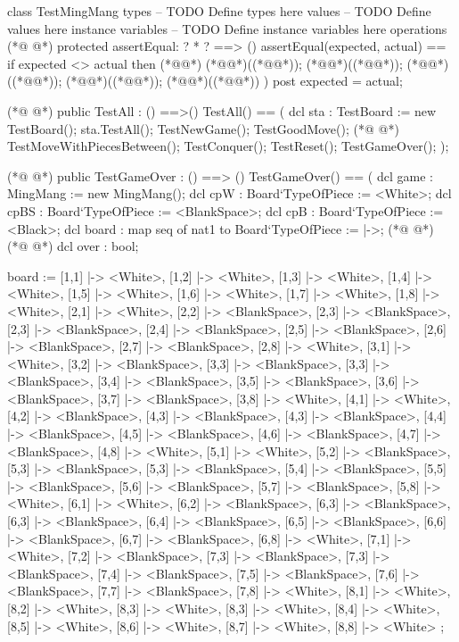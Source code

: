 \begin{vdmpp}[breaklines=true]
class TestMingMang
types
-- TODO Define types here
values
-- TODO Define values here
instance variables
-- TODO Define instance variables here
operations
(*@
\label{assertEqual:9}
@*)
protected assertEqual: ? * ? ==> ()
 assertEqual(expected, actual) == 
  if expected <> actual then (*@\vdmnotcovered{(}@*)
    (*@@*)((*@@*));
    (*@@*)((*@@*)); 
    (*@@*)((*@@*));
    (*@@*)((*@@*));
    (*@@*)((*@@*))
  )
 post expected = actual;

(*@
\label{TestAll:20}
@*)
 public TestAll : () ==>()
 TestAll() ==
 (
  dcl sta : TestBoard := new TestBoard();
  sta.TestAll();
  TestNewGame();
  TestGoodMove();
(*@
\label{TestNewGame:27}
@*)
  TestMoveWithPiecesBetween();
  TestConquer();
  TestReset();
  TestGameOver();
 );
 
(*@
\label{TestGameOver:33}
@*)
 public TestGameOver : () ==> ()
 TestGameOver() ==
 (
  dcl game : MingMang := new MingMang();
  dcl cpW : Board`TypeOfPiece := <White>;
  dcl cpBS : Board`TypeOfPiece := <BlankSpace>;
  dcl cpB : Board`TypeOfPiece := <Black>;
  dcl board : map seq of nat1 to Board`TypeOfPiece := {|->};
(*@
\label{TestGoodMove:41}
@*)
(*@
\label{TestReset:41}
@*)
  dcl over : bool;
  
  board := {
     [1,1] |-> <White>, [1,2] |-> <White>, [1,3] |-> <White>, [1,4] |-> <White>, [1,5] |-> <White>, [1,6] |-> <White>, [1,7] |-> <White>, [1,8] |-> <White>,
     [2,1] |-> <White>, [2,2] |-> <BlankSpace>, [2,3] |-> <BlankSpace>, [2,3] |-> <BlankSpace>, [2,4] |-> <BlankSpace>, [2,5] |-> <BlankSpace>, [2,6] |-> <BlankSpace>, [2,7] |-> <BlankSpace>, [2,8] |-> <White>,
     [3,1] |-> <White>, [3,2] |-> <BlankSpace>, [3,3] |-> <BlankSpace>, [3,3] |-> <BlankSpace>, [3,4] |-> <BlankSpace>, [3,5] |-> <BlankSpace>, [3,6] |-> <BlankSpace>, [3,7] |-> <BlankSpace>, [3,8] |-> <White>,
     [4,1] |-> <White>, [4,2] |-> <BlankSpace>, [4,3] |-> <BlankSpace>, [4,3] |-> <BlankSpace>, [4,4] |-> <BlankSpace>, [4,5] |-> <BlankSpace>, [4,6] |-> <BlankSpace>, [4,7] |-> <BlankSpace>, [4,8] |-> <White>,
     [5,1] |-> <White>, [5,2] |-> <BlankSpace>, [5,3] |-> <BlankSpace>, [5,3] |-> <BlankSpace>, [5,4] |-> <BlankSpace>, [5,5] |-> <BlankSpace>, [5,6] |-> <BlankSpace>, [5,7] |-> <BlankSpace>, [5,8] |-> <White>,
     [6,1] |-> <White>, [6,2] |-> <BlankSpace>, [6,3] |-> <BlankSpace>, [6,3] |-> <BlankSpace>, [6,4] |-> <BlankSpace>, [6,5] |-> <BlankSpace>, [6,6] |-> <BlankSpace>, [6,7] |-> <BlankSpace>, [6,8] |-> <White>,
     [7,1] |-> <White>, [7,2] |-> <BlankSpace>, [7,3] |-> <BlankSpace>, [7,3] |-> <BlankSpace>, [7,4] |-> <BlankSpace>, [7,5] |-> <BlankSpace>, [7,6] |-> <BlankSpace>, [7,7] |-> <BlankSpace>, [7,8] |-> <White>,
     [8,1] |-> <White>, [8,2] |-> <White>, [8,3] |-> <White>, [8,3] |-> <White>, [8,4] |-> <White>, [8,5] |-> <White>, [8,6] |-> <White>, [8,7] |-> <White>, [8,8] |-> <White>
   };
   

\end{vdmpp}
